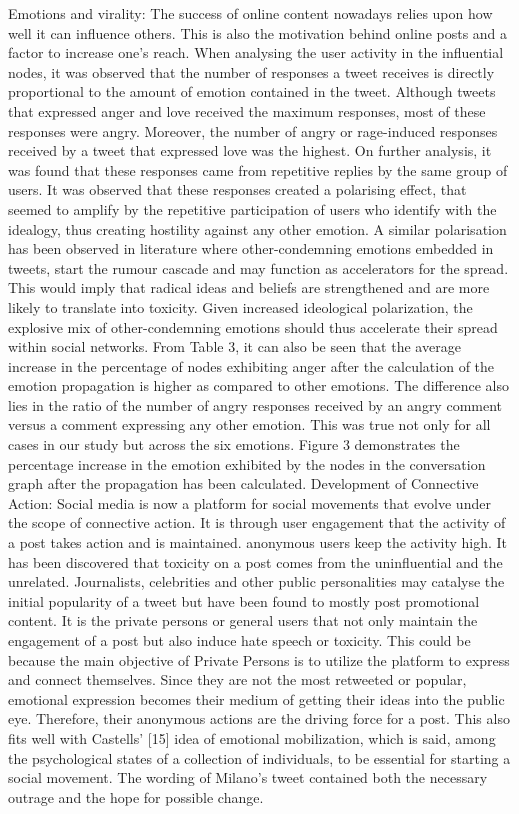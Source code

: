 \documentclass[acmtog]{acmart}
\begin{document}
Emotions and virality: The success of online content nowadays relies upon how well it can influence others. This is also the motivation behind online posts and a factor to increase one's reach. When analysing the user activity in the influential nodes, it was observed that the number of responses a tweet receives is directly proportional to the amount of emotion contained in the tweet. Although tweets that expressed anger and love received the maximum responses, most of these responses were angry. Moreover, the number of angry or rage-induced responses received by a tweet that expressed love was the highest. On further analysis, it was found that these responses came from repetitive replies by the same group of users. It was observed that these responses created a polarising effect, that seemed to amplify by the repetitive participation of users who identify with the idealogy, thus creating hostility against any other emotion. A similar polarisation has been observed in literature where other-condemning emotions embedded in tweets, start the rumour cascade and may function as accelerators for the spread. This would imply that radical ideas and beliefs are strengthened and are more likely to translate into toxicity. Given increased ideological polarization, the explosive mix of other-condemning emotions should thus accelerate their spread within social networks. From Table 3, it can also be seen that the average increase in the percentage of nodes exhibiting anger after the calculation of the emotion propagation is higher as compared to other emotions. The difference also lies in the ratio of the number of angry responses received by an angry comment versus a comment expressing any other emotion. This was true not only for all cases in our study but across the six emotions. Figure 3 demonstrates the percentage increase in the emotion exhibited by the nodes in the conversation graph after the propagation has been calculated.
Development of Connective Action: Social media is now a platform for social movements that evolve under the scope of connective action. It is through user engagement that the activity of a post takes action and is maintained. anonymous users keep the activity high. It has been discovered that toxicity on a post comes from the uninfluential and the unrelated. Journalists, celebrities and other public personalities may catalyse the initial popularity of a tweet but have been found to mostly post promotional content. It is the private persons or general users that not only maintain the engagement of a post but also induce hate speech or toxicity. This could be because the main objective of Private Persons is to utilize the platform to express and connect themselves. Since they are not the most retweeted or popular, emotional expression becomes their medium of getting their ideas into the public eye. Therefore, their anonymous actions are the driving force for a post. This also fits well with Castells’ [15] idea of emotional mobilization, which is said, among the psychological states of a collection of individuals, to be essential for starting a social movement. The wording of Milano’s tweet contained both the necessary outrage and the hope for possible change.
\end{document}
